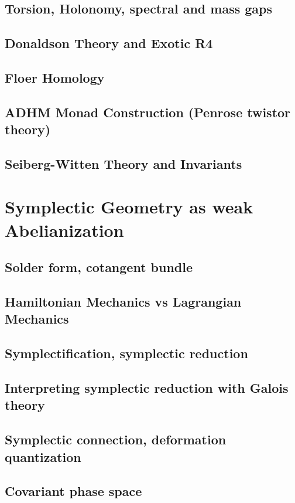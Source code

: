 \documentclass{article}
\theoremstyle{definition}
\begin{document}
    \subsection{Torsion, Holonomy, spectral and mass gaps}
    \subsection{Donaldson Theory and Exotic R4}
    \subsection{Floer Homology}
    \subsection{ADHM Monad Construction (Penrose twistor theory)}
    \subsection{Seiberg-Witten Theory and Invariants}

\section{Symplectic Geometry as weak Abelianization}
    \subsection{Solder form, cotangent bundle}
    \subsection{Hamiltonian Mechanics vs Lagrangian Mechanics}
    \subsection{Symplectification, symplectic reduction}
    \subsection{Interpreting symplectic reduction with Galois theory}
    \subsection{Symplectic connection, deformation quantization}
    \subsection{Covariant phase space}
\end{document}
